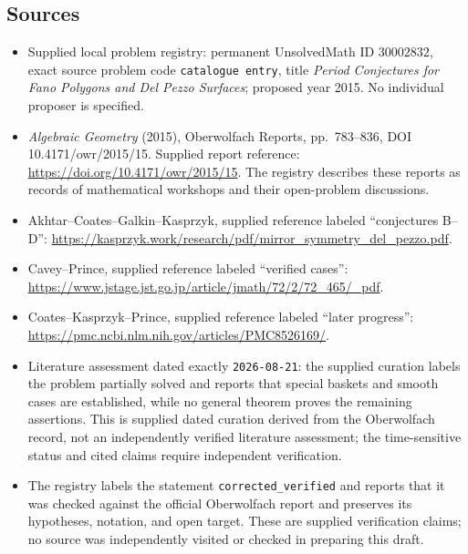 \documentclass[11pt]{article}
\begin{document}
\subsection{Sources}
\begin{itemize}
\item Supplied local problem registry: permanent UnsolvedMath ID \(30002832\), exact source problem code \texttt{catalogue entry}, title \emph{Period Conjectures for Fano Polygons and Del Pezzo Surfaces}; proposed year 2015. No individual proposer is specified.
\item \emph{Algebraic Geometry} (2015), Oberwolfach Reports, pp.\ 783--836, DOI 10.4171/owr/2015/15. Supplied report reference: \url{https://doi.org/10.4171/owr/2015/15}. The registry describes these reports as records of mathematical workshops and their open-problem discussions.
\item Akhtar--Coates--Galkin--Kasprzyk, supplied reference labeled ``conjectures B--D'': \url{https://kasprzyk.work/research/pdf/mirror_symmetry_del_pezzo.pdf}.
\item Cavey--Prince, supplied reference labeled ``verified cases'': \url{https://www.jstage.jst.go.jp/article/jmath/72/2/72_465/_pdf}.
\item Coates--Kasprzyk--Prince, supplied reference labeled ``later progress'': \url{https://pmc.ncbi.nlm.nih.gov/articles/PMC8526169/}.
\item Literature assessment dated exactly \texttt{2026-08-21}: the supplied curation labels the problem partially solved and reports that special baskets and smooth cases are established, while no general theorem proves the remaining assertions. This is supplied dated curation derived from the Oberwolfach record, not an independently verified literature assessment; the time-sensitive status and cited claims require independent verification.
\item The registry labels the statement \texttt{corrected\_verified} and reports that it was checked against the official Oberwolfach report and preserves its hypotheses, notation, and open target. These are supplied verification claims; no source was independently visited or checked in preparing this draft.
\end{itemize}
\end{document}
